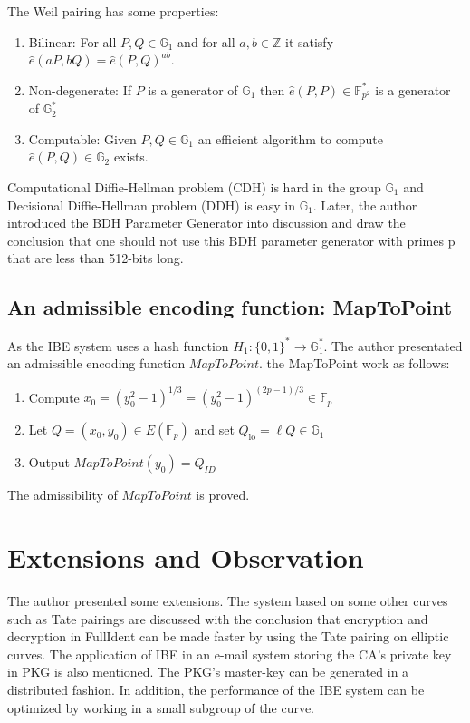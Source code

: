 \documentclass[runningheads,a4paper]{llncs}
\begin{document}
The Weil pairing has some properties:
\begin{enumerate}
	\item Bilinear: For all $P,Q\in \mathbb{G}_1$ and for all $a,b\in \mathbb{Z}$ it satisfy $\hat{e}(a P, b Q)=\hat{e}(P, Q)^{a b}$.
	\item Non-degenerate: If $P$ is a generator of $\mathbb{G}_1$ then $\hat{e}(P, P) \in \mathbb{F}_{p^{2}}^{*}$ is a generator of $\mathbb{G}_2^*$
	\item Computable: Given $P, Q \in \mathbb{G}_{1}$ an efficient algorithm to compute $\hat{e}(P, Q) \in \mathbb{G}_{2}$ exists.
\end{enumerate}
Computational Diffie-Hellman problem (CDH) is hard in the group $\mathbb{G}_1$ and Decisional Diffie-Hellman problem (DDH) is easy in $\mathbb{G}_1$. Later, the author introduced the BDH Parameter Generator into discussion and draw the conclusion that one should not use this BDH parameter generator with primes p that are less than 512-bits long.
\subsection{An admissible encoding function: MapToPoint}
As the IBE system uses a hash function $H_1:\{0,1\}^*\rightarrow\mathbb{G}_1^*$. The author presentated an admissible encoding function $MapToPoint$.
the MapToPoint work as follows:
\begin{enumerate}
	\item Compute $x_{0}=\left(y_{0}^{2}-1\right)^{1 / 3}=\left(y_{0}^{2}-1\right)^{(2 p-1) / 3} \in \mathbb{F}_{p}$
	\item Let $Q=\left(x_{0}, y_{0}\right) \in E\left(\mathbb{F}_{p}\right)$ and set $Q_{\mathrm{lo}}=\ell Q \in \mathbb{G}_{1}$
	\item Output $MapToPoint(y_0)=Q_{ID}$ 
\end{enumerate}
The admissibility of $MapToPoint$ is proved.

\section{Extensions and Observation}
The author presented some extensions. The system based on some other curves such as Tate pairings are discussed with the conclusion that encryption and decryption in FullIdent can be made faster by using the Tate pairing on elliptic curves. The application of IBE in an e-mail system storing the CA's private key in PKG is also mentioned. The PKG's master-key can be generated in a distributed fashion. In addition, the performance of the IBE system can be optimized by working in a small subgroup of the curve. 
\end{document}
